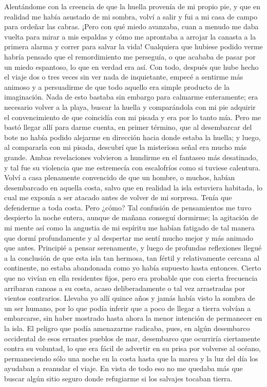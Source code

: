 \documentclass{novela}
\begin{document}
    Alentándome con la creencia de que la huella provenía de mi propio pie, y que en realidad me había asustado de mi sombra, volví a salir y fui a mi casa de campo para ordeñar las cabras. ¡Pero con qué miedo avanzaba, cuan a menudo me daba vuelta para mirar a mis espaldas y cómo me aprontaba a arrojar la canasta a la primera alarma y correr para salvar la vida! Cualquiera que hubiese podido verme habría pensado que el remordimiento me perseguía, o que acababa de pasar por un miedo espantoso, lo que en verdad era así.
    Con todo, después que hube hecho el viaje dos o tres veces sin ver nada de inquietante, empecé a sentirme más animoso y a persuadirme de que todo aquello era simple producto de la imaginación. Nada de esto bastaba sin embargo para calmarme enteramente; era necesario volver a la playa, buscar la huella y comparándola con mi pie adquirir el convencimiento de que coincidía con mi pisada y era por lo tanto mía. Pero me bastó llegar allí para darme cuenta, en primer término, que al desembarcar del bote no había podido alejarme en dirección hacia donde estaba la huella; y luego, al compararla con mi pisada, descubrí que la misteriosa señal era mucho más grande. Ambas revelaciones volvieron a hundirme en el fantaseo más desatinado, y tal fue su violencia que me estremecía con escalofríos como si tuviese calentura. Volví a casa plenamente convencido de que un hombre, o muchos, habían desembarcado en aquella costa, salvo que en realidad la isla estuviera habitada, lo cual me exponía a ser atacado antes de volver de mi sorpresa. Tenía que defenderme a toda costa. Pero ¿cómo?
    Tal confusión de pensamientos me tuvo despierto la noche entera, aunque de mañana conseguí dormirme; la agitación de mi mente así como la angustia de mi espíritu me habían fatigado de tal manera que dormí profundamente y al despertar me sentí mucho mejor y más animado que antes. Principié a pensar serenamente, y luego de profundas reflexiones llegué a la conclusión de que esta isla tan hermosa, tan fértil y relativamente cercana al continente, no estaba abandonada como yo había supuesto hasta entonces. Cierto que no vivían en ella residentes fijos, pero era probable que con cierta frecuencia arribaran canoas a su costa, acaso deliberadamente o tal vez arrastradas por vientos contrarios. Llevaba yo allí quince años y jamás había visto la sombra de un ser humano, por lo que podía inferir que a poco de llegar a tierra volvían a embarcarse, sin haber mostrado hasta ahora la menor intención de permanecer en la isla. El peligro que podía amenazarme radicaba, pues, en algún desembarco occidental de esos errantes pueblos de mar, desembarco que ocurriría ciertamente contra su voluntad, lo que era fácil de advertir en su prisa por volverse al océano, permaneciendo sólo una noche en la costa hasta que la marea y la luz del día los ayudaban a reanudar el viaje. En vista de todo eso no me quedaba más que buscar algún sitio seguro donde refugiarme si los salvajes tocaban tierra.
\end{document}
